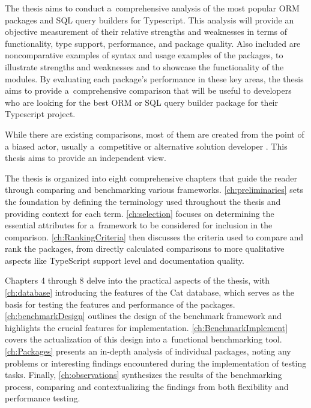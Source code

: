 The thesis aims to conduct a~comprehensive analysis of the most popular ORM
packages and SQL query builders for Typescript. This analysis will provide an
objective measurement of their relative strengths and weaknesses in terms of
functionality, type support, performance, and package quality. Also included are
noncomparative examples of syntax and usage examples of the packages, to
illustrate strengths and weaknesses and to showcase the functionality of the
modules. By evaluating each package's performance in these key areas, the thesis
aims to provide a~comprehensive comparison that will be useful to developers who
are looking for the best ORM or SQL query builder package for their Typescript
project.

While there are existing comparisons, most of them are created from the point of
a biased actor, usually a~competitive or alternative solution developer
\cite{drizzleComparison} \cite{imdbBench}. This thesis aims to provide an
independent view.


The thesis is organized into eight comprehensive chapters that guide the reader
through comparing and benchmarking various frameworks.
\autoref{ch:preliminaries} sets the foundation by defining the terminology used
throughout the thesis and providing context for each term.
\autoref{ch:selection} focuses on determining the essential attributes for
a~framework to be considered for inclusion in the comparison.
\autoref{ch:RankingCriteria} then discusses the criteria used to compare and
rank the packages, from directly calculated comparisons to more qualitative
aspects like TypeScript support level and documentation quality.

Chapters 4 through 8 delve into the practical aspects of the thesis, with
\autoref{ch:database} introducing the features of the Cat database, which serves
as the basis for testing the features and performance of the packages.
\autoref{ch:benchmarkDesign} outlines the design of the benchmark framework and
highlights the crucial features for implementation.
\autoref{ch:BenchmarkImplement} covers the actualization of this design into
a~functional benchmarking tool. \autoref{ch:Packages} presents an in-depth
analysis of individual packages, noting any problems or interesting findings
encountered during the implementation of testing tasks. Finally,
\autoref{ch:observations} synthesizes the results of the benchmarking process,
comparing and contextualizing the findings from both flexibility and performance
testing.